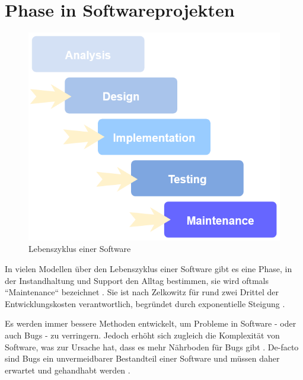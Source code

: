 
\section{Phase in Softwareprojekten}

	\begin{figure}
		\centering
		\vspace{-\baselineskip}
		\includegraphics[width=\linewidth]{img/02_maintenance/software-life-cycle.png}
		\caption{Lebenszyklus einer Software}
		\label{fig:software-development-life-cycle}
	\end{figure}
	
	In vielen Modellen über den Lebenszyklus einer Software gibt es eine Phase, in der Instandhaltung und Support den Alltag bestimmen, sie wird oftmals ``Maintenance`` bezeichnet \cite{ManagingTheComplexityOfWebSystemsDevelopment} \cite{ASimulationModelWaterfallSoftware}. Sie ist nach Zelkowitz \etal \cite{PrinciplesOfSoftwareEngineeringAndDesign} für rund zwei Drittel der Entwicklungskosten verantwortlich, begründet durch exponentielle Steigung \cite{ExtremeProgrammingExplained}.
	
	Es werden immer bessere Methoden entwickelt, um Probleme in Software - oder auch Bugs - zu verringern. Jedoch erhöht sich zugleich die Komplexität von Software, was zur Ursache hat, dass es mehr Nährboden für Bugs gibt \cite{TrackingDownSoftwareBugsAnomalyDetection}. De-facto sind Bugs ein unvermeidbarer Bestandteil einer Software und müssen daher erwartet und gehandhabt werden \cite{TheMythicalManMonth}.
	
